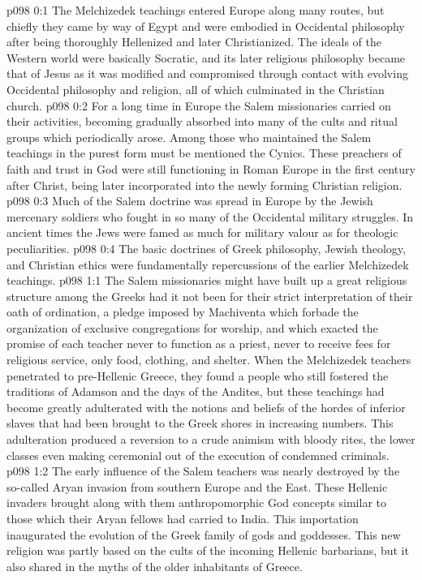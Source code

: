 \author{Melchizedek}
\vs p098 0:1 The Melchizedek teachings entered Europe along many routes, but chiefly they came by way of Egypt and were embodied in Occidental philosophy after being thoroughly Hellenized and later Christianized. The ideals of the Western world were basically Socratic, and its later religious philosophy became that of Jesus as it was modified and compromised through contact with evolving Occidental philosophy and religion, all of which culminated in the Christian church.
\vs p098 0:2 For a long time in Europe the Salem missionaries carried on their activities, becoming gradually absorbed into many of the cults and ritual groups which periodically arose. Among those who maintained the Salem teachings in the purest form must be mentioned the Cynics. These preachers of faith and trust in God were still functioning in Roman Europe in the first century after Christ, being later incorporated into the newly forming Christian religion.
\vs p098 0:3 Much of the Salem doctrine was spread in Europe by the Jewish mercenary soldiers who fought in so many of the Occidental military struggles. In ancient times the Jews were famed as much for military valour as for theologic peculiarities.
\vs p098 0:4 The basic doctrines of Greek philosophy, Jewish theology, and Christian ethics were fundamentally repercussions of the earlier Melchizedek teachings.
\vs p098 1:1 The Salem missionaries might have built up a great religious structure among the Greeks had it not been for their strict interpretation of their oath of ordination, a pledge imposed by Machiventa which forbade the organization of exclusive congregations for worship, and which exacted the promise of each teacher never to function as a priest, never to receive fees for religious service, only food, clothing, and shelter. When the Melchizedek teachers penetrated to pre\hyp{}Hellenic Greece, they found a people who still fostered the traditions of Adamson and the days of the Andites, but these teachings had become greatly adulterated with the notions and beliefs of the hordes of inferior slaves that had been brought to the Greek shores in increasing numbers. This adulteration produced a reversion to a crude animism with bloody rites, the lower classes even making ceremonial out of the execution of condemned criminals.
\vs p098 1:2 The early influence of the Salem teachers was nearly destroyed by the so\hyp{}called Aryan invasion from southern Europe and the East. These Hellenic invaders brought along with them anthropomorphic God concepts similar to those which their Aryan fellows had carried to India. This importation inaugurated the evolution of the Greek family of gods and goddesses. This new religion was partly based on the cults of the incoming Hellenic barbarians, but it also shared in the myths of the older inhabitants of Greece.
